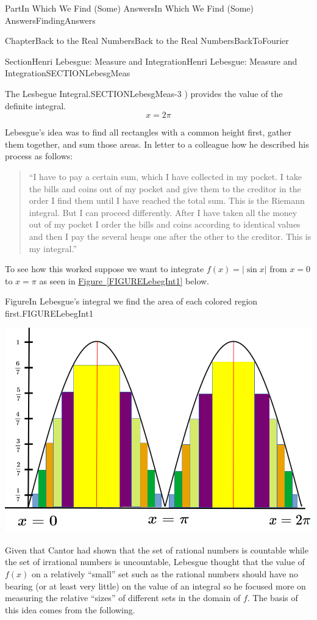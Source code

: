 \documentclass[oneside,10pt,]{book}
\newcommand{\xreffont}{\relax}
\numberwithin{equation}{part}
\newcommand{\abs}[1]{\left|#1\right|}
\begin{document}
\begin{partptx}{Part}{In Which We Find (Some) Answers}{}{In Which We Find (Some) Answers}{}{}{FindingAnswers}
\begin{chapterptx}{Chapter}{Back to the Real Numbers}{}{Back to the Real Numbers}{}{}{BackToFourier}
\begin{sectionptx}{Section}{Henri Lebesgue: Measure and Integration}{}{Henri Lebesgue: Measure and Integration}{}{}{SECTIONLebesgMeas}
\begin{paragraphs}{The Lesbegue Integral.}{SECTIONLebesgMeas-3}
\right) \) provides the value of the definite integral.%
\begin{equation*}
x=2\pi{}
\end{equation*}
%
\par
         Lebesgue's idea was to find all rectangles with a common height first, gather them together, and sum those areas. In  letter to a colleague how he  described his process as follows:%
\begin{quote}%
``I have to pay a certain sum, which I have collected in my pocket. I take the bills and coins out of my pocket and give them to the creditor in the order I find them until I have reached the total sum. This is the Riemann integral. But I can proceed differently. After I have taken all the money out of my pocket I order the bills and coins according to identical values and then I pay the several heaps one after the other to the creditor. This is my integral.''%
\end{quote}
To see how this worked suppose we want to integrate \(f(x)=\abs{\sin x}\) from \(x=0\) to \(x=\pi{}\) as seen in \hyperref[FIGURELebegInt1]{Figure~{\xreffont\ref{FIGURELebegInt1}}} below.%
\begin{figureptx}{Figure}{In Lebesgue's integral we find the area of each colored region first.}{FIGURELebegInt1}{}%
\begin{image}{0}{1}{0}{}%
\includegraphics[width=\linewidth]{external/images/LebInt2.png}
\end{image}%
\tcblower
\end{figureptx}%
Given that Cantor had shown that the set of rational numbers is countable while the set of irrational numbers is uncountable, Lebesgue thought that the value of \(f\left(x\right)\) on a relatively ``small'' set such as the rational numbers should have no bearing (or at least very little) on the value of an integral so he focused more on measuring the relative ``sizes'' of different sets in the domain of \(f\). The basis of this idea comes from the following.%

\end{paragraphs}
\end{sectionptx}
\end{chapterptx}
\end{partptx}
\end{document}

